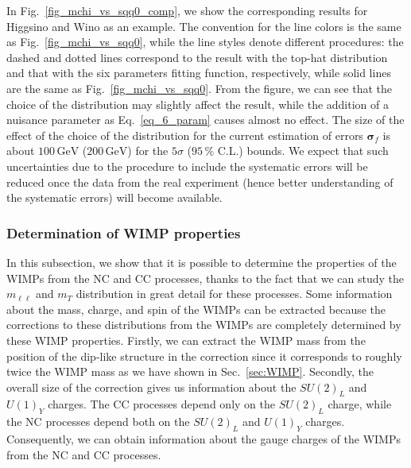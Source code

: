 \documentclass[12pt,twoside,book]{article}
\begin{document}
In Fig.~\ref{fig_mchi_vs_sqq0_comp}, we show the corresponding results for Higgsino and Wino as an example.
The convention for the line colors is the same as Fig.~\ref{fig_mchi_vs_sqq0}, while the line styles denote different procedures: the dashed and dotted lines correspond to the result with the top-hat distribution and that with the six parameters fitting function, respectively, while solid lines are the same as Fig.~\ref{fig_mchi_vs_sqq0}.
From the figure, we can see that the choice of the distribution may slightly affect the result, while the addition of a nuisance parameter as Eq.~\eqref{eq_6_param} causes almost no effect.
The size of the effect of the choice of the distribution for the current estimation of errors $\bm{\sigma}_f$ is about $100\,\mathrm{GeV}$ ($200\,\mathrm{GeV}$) for the $5\sigma$ ($95\,\%$ C.L.) bounds.
We expect that such uncertainties due to the procedure to include the systematic errors will be reduced once the data from the real experiment (hence better understanding of the systematic errors) will become available.


\subsubsection{Determination of WIMP properties}
\label{sec_property}

In this subsection, we show that it is possible to determine the properties of the WIMPs from the NC and CC processes, thanks to the fact that we can study the $m_{\ell\ell}$ and $m_T$ distribution in great detail for these processes.
Some information about the mass, charge, and spin of the WIMPs can be extracted because the corrections to these distributions from the WIMPs are completely determined by these WIMP properties.
Firstly, we can extract the WIMP mass from the position of the dip-like structure in the correction since it corresponds to roughly twice the WIMP mass as we have shown in Sec.~\ref{sec:WIMP}.
Secondly, the overall size of the correction gives us information about the $SU(2)_L$ and $U(1)_Y$ charges.
The CC processes depend only on the $SU(2)_L$ charge, while the NC processes depend both on the $SU(2)_L$ and $U(1)_Y$ charges.
Consequently, we can obtain information about the gauge charges of the WIMPs from the NC and CC processes.
\end{document}
